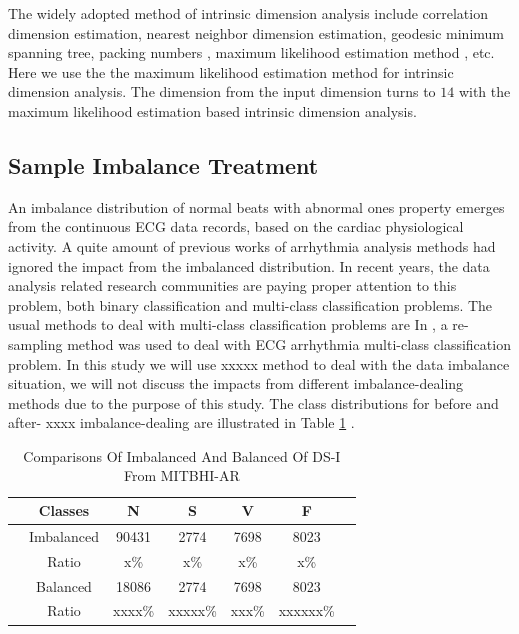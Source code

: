 \documentclass[journal]{IEEEtran}
\begin{document}
The widely adopted method of intrinsic dimension analysis include correlation dimension estimation, nearest neighbor dimension estimation\cite{costa2005estimating}, geodesic minimum spanning tree\cite{costa2004geodesic}, packing numbers \cite{kegl2003intrinsic}, maximum likelihood estimation method \cite{levina2005maximum}, etc.
Here we use the the maximum likelihood estimation method for intrinsic dimension analysis.
The dimension from the input dimension turns to $14$ with the maximum likelihood estimation based intrinsic dimension analysis.



%
%
\subsection{Sample Imbalance Treatment}
An imbalance distribution of normal beats with abnormal ones property emerges from the continuous ECG data records, based on the cardiac physiological activity.
A quite amount of previous works of arrhythmia analysis methods had ignored the impact from the imbalanced distribution.
In recent years, the data analysis related research communities are paying proper attention to this problem, both binary classification\cite{he2009learning} and multi-class classification \cite{wang2012multiclass} problems.
The usual methods to deal with multi-class classification problems are 
In \cite{rajesh2018classification}, a re-sampling method was used to deal with ECG arrhythmia multi-class classification problem.
In this study we will use xxxxx method to deal with the data imbalance situation, we will not discuss the impacts from different imbalance-dealing methods due to the purpose of this study.
The class distributions for before and after- xxxx imbalance-dealing are illustrated in Table \ref{distriofData} .


\begin{table}[!htbp]
\begin{center}
\begin{threeparttable}
\caption{Comparisons Of Imbalanced And Balanced Of DS-I From MITBHI-AR}
\label{distriofData}
\begin{tabular}{ccccccc}
\hline
& Classes & N & S & V  & F \\
\hline
& Imbalanced  &90431  & 2774  & 7698   &8023\\
& Ratio & x\%&  x\%& x\%  & x\% \\
\hline
& Balanced  & 18086 & 2774  & 7698 & 8023         \\
& Ratio & xxxx\%&  xxxxx\%& xxx\%  & xxxxxx\% \\
\hline
\end{tabular}
\end{threeparttable}
\end{center}
\end{table}
     
\end{document}

